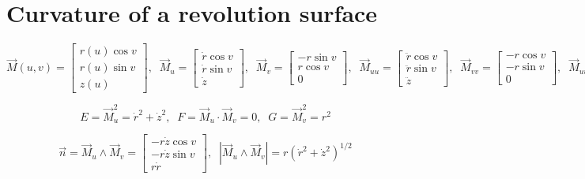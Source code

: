 \documentclass[aps,onecolumn]{revtex4}
\begin{document}
\section{Curvature of a revolution surface}

\begin{equation}
	\vec{M}(u,v) = 
	\begin{bmatrix}
	r(u)\cos v\\
	r(u)\sin v\\
	z(u)
	\end{bmatrix},
	\;\;
	\vec{M}_u = 
	\begin{bmatrix}
	\dot{r}\cos v\\
	\dot{r}\sin v\\
	\dot{z}
	\end{bmatrix},
	\;\;
	\vec{M}_v = 
	\begin{bmatrix}
	-r \sin v\\
	 r \cos v\\
	 0
	\end{bmatrix},
	\;\;
	\vec{M}_{uu} = 
	\begin{bmatrix}
	\ddot{r} \cos v\\
	\ddot{r} \sin v\\
	\ddot{z}
	\end{bmatrix},
	\;\;
	\vec{M}_{vv} = 
	\begin{bmatrix}
	-r \cos v\\
	-r \sin v\\
	0
	\end{bmatrix},
	\;\;
	\vec{M}_{uv} = 
	\begin{bmatrix}
	-\dot{r} \sin v\\
	 \dot{r} \cos v\\
	 0
	\end{bmatrix}
\end{equation}

\begin{equation}
	E = \vec{M}_u^2 = \dot{r}^2 + \dot{z}^2,\;\;
	F = \vec{M}_u \cdot \vec{M}_v = 0,\;\;
	G = \vec{M}_v^2 = r^2
\end{equation}

\begin{equation}
	\vec{n} = \vec{M}_u \wedge \vec{M}_v = 
	\begin{bmatrix}
	-r\dot{z}\cos v\\
	-r\dot{z}\sin v\\
	r\dot{r}
	\end{bmatrix},\;\;
	\left\vert\vec{M}_u \wedge \vec{M}_v\right\vert = r\left(\dot{r}^2 + \dot{z}^2\right)^{1/2}
\end{equation}
\end{document}
